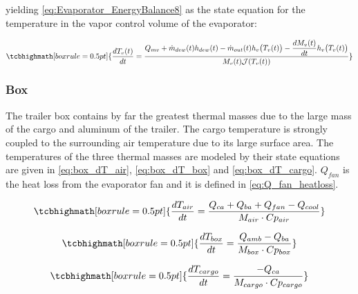 yielding \cref{eq:Evaporator_EnergyBalance8} as the state equation for the temperature in the vapor control volume of the evaporator:

\begin{equation}
	\tcbhighmath[boxrule = 0.5pt]{\frac{dT_v(t)}{dt}  = \dfrac{Q_{mv} + \dot{m}_{dew}(t)h_{dew}(t) - \dot{m}_{out}(t)h_v\bigl(T_{v}(t)\bigr) - \dfrac{dM_{v}(t)}{dt} h_v\bigl(T_v(t)\bigr)}{M_{v}(t) \mathcal{J}(T_v(t)) } } \label{eq:Evaporator_EnergyBalance8}
\end{equation}



\subsubsection{Box}
The trailer box contains by far the greatest thermal masses due to the large mass of the cargo and aluminum of the trailer. The cargo temperature is strongly coupled to the surrounding air temperature due to its large surface area. The temperatures of the three thermal masses are modeled by their state equations are given in \cref{eq:box_dT_air}, \cref{eq:box_dT_box} and \cref{eq:box_dT_cargo}. $Q_{fan}$ is the heat loss from the evaporator fan and it is defined in \cref{eq:Q_fan_heatloss}.

\begin{equation}
	\tcbhighmath[boxrule = 0.5pt]{\frac{dT_{air}}{dt} = \frac{Q_{ca} + Q_{ba} + Q_{fan} -Q_{cool}}{M_{air} \cdot Cp_{air}}} \label{eq:box_dT_air}
\end{equation}

\begin{equation}
	\tcbhighmath[boxrule = 0.5pt]{\frac{dT_{box}}{dt} = \frac{Q_{amb} - Q_{ba}}{M_{box} \cdot Cp_{box}}} \label{eq:box_dT_box}
\end{equation}

\begin{equation}
	\tcbhighmath[boxrule = 0.5pt]{\frac{dT_{cargo}}{dt} = \frac{-Q_{ca}}{M_{cargo} \cdot Cp_{cargo}}} \label{eq:box_dT_cargo}
\end{equation}



